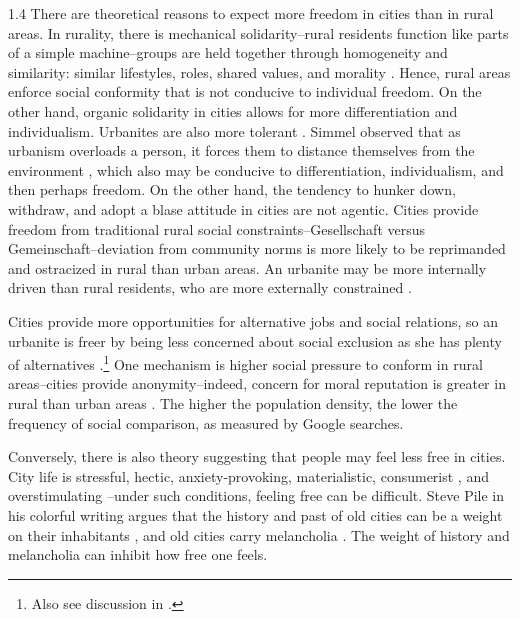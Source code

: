 \documentclass[10pt, letterpaper]{article}
\begin{document}
\begin{spacing}{1.4}
There are theoretical reasons to expect more freedom in cities than in rural areas. In rurality, there is mechanical solidarity--rural residents function like parts of a simple machine--groups are held together through homogeneity and similarity:
similar lifestyles, roles, shared values, and morality \citep{durkheim97}. Hence, rural areas enforce social conformity that is not conducive to individual freedom. On the other hand, organic solidarity in cities allows for more differentiation and individualism. %
 Urbanites are also more tolerant \citep{tuch87}.
% 
Simmel observed that as urbanism overloads a person, it forces them to distance themselves from the environment \citep{simmel03}, which also may be conducive to differentiation, individualism, and then perhaps freedom. On the other hand, the tendency to hunker down, withdraw, and adopt a blase attitude in cities \citep{simmel03} are not agentic.  
%
% 
Cities provide freedom from traditional rural social constraints--Gesellschaft versus Gemeinschaft--deviation from community norms is more likely to be reprimanded and ostracized in rural than urban areas. An urbanite may be more internally driven than rural residents, who are more externally constrained \citep{yamagishi12}. 

Cities provide more opportunities for alternative jobs and social relations, so an urbanite is freer by being less concerned about social exclusion as she has plenty of alternatives \citep{yamagishi12}.\footnote{Also see discussion in \citet{luca2023progressive}.} %
 One mechanism is higher social pressure to conform in rural areas--cities provide anonymity--indeed, concern for moral reputation is greater in rural than urban areas
 \citep[Danielson et al 2023 cited in][]{aokOttCh26}. The higher the population density, the lower the frequency of social comparison, as measured by Google searches\citep[][]{aokOttCh26}.  
 
Conversely, there is also theory suggesting that people may feel less free in cities. City life is stressful, hectic, anxiety-provoking, materialistic, consumerist \citep{aokCityBook15}, and overstimulating \citep{simmel03,lederbogen11}--under such conditions, feeling free can be difficult.
Steve Pile in his colorful writing argues that the history and past of old cities can be a weight on their inhabitants \citep{pile05,pile05B,pile99}, and old cities carry melancholia \citep{pile05B}. The weight of history and melancholia can inhibit how free one feels.


\end{spacing}
\end{document}
